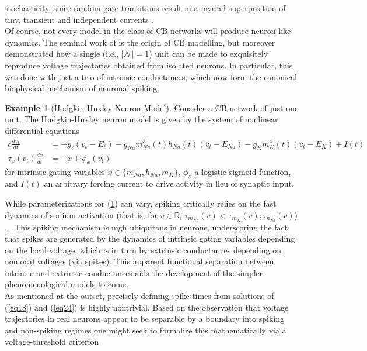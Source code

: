\documentclass[12pt, oneside]{report}
\newcommand{\mbb}[1]{\mathbb{#1}}
\newcommand{\1}[1]{\mathbbm{1}_{\{#1\}}}
\newcommand{\mc}[1]{\mathcal{#1}}
\theoremstyle{definition}
\newtheorem{example}[theorem]{Example}
\begin{document}
stochasticity, since random gate transitions result in a myriad superposition of
tiny, transient and independent currents \cite{Destexhe_Mainen_Sejnowski_1994}.\\[5pt]
\indent Of course, not every model in the class of CB networks will produce neuron-like dynamics. The seminal
work of \cite{Hodgkin_Huxley_1952} is the origin of CB modelling, but moreover
demonstrated how a single (i.e., $|\mc{N}|=1$) unit can be made to exquisitely
reproduce voltage trajectories obtained from isolated neurons. In particular,
this was done with just a trio of intrinsic conductances, which now form the
canonical biophysical mechanism of neuronal spiking. 
\begin{example}[Hodgkin-Huxley Neuron Model]\label{ex1} Consider a CB network of
    just one unit. The Hudgkin-Huxley neuron model is given by the system of
    nonlinear differential equations 
    \begin{align*}
        c\frac{dv_t}{dt}&=-g_\ell(v_t-E_\ell)-g_{Na}m^3_{Na}(t)h_{Na}(t)(v_t-E_{Na})-g_Km^4_K(t)(v_t-E_K)+I(t)\\
        \tau_x(v_t)\frac{dx}{dt}&=-x+\phi_x(v_t)
    \end{align*}
    for intrinsic gating variables $x\in\{m_{Na},h_{Na},m_K\}$, $\phi_x$ a
    logistic sigmoid function, and $I(t)$ an arbitrary forcing current to drive
    activity in lieu of synaptic input.
\end{example}
While parameterizations for (\ref{ex1}) can vary, spiking critically relies on
the fast dynamics of sodium activation (that is, for $v\in\mbb{R}$,
$\tau_{m_{Na}}(v)<\tau_{m_K}(v),\tau_{h_{Na}}(v)$) \cite{Gerstner_Kistler_Naud_Paninski_2014},
\cite{Sepulchre_2022}. This spiking mechanism is nigh ubiquitous in neurons,
underscoring the fact that spikes are generated by the dynamics of intrinsic
gating variables depending on the local voltage, which is in turn  by
extrinsic conductances depending on nonlocal voltages (via spikes). This
apparent functional separation between intrinsic and extrinsic conductances aids
the development of the simpler phenomenological models to come.\\[5pt]
\indent As mentioned at the outset, precisely defining spike times from
solutions of (\ref{eq18}) and (\ref{eq24}) is highly nontrivial. Based on the
observation that voltage trajectories in real neurons appear to be separable by
a boundary into spiking and non-spiking regimes \cite{Brunel_van_Rossum_2007} one might seek
to formalize this mathematically via a voltage-threshold criterion
\end{document}

